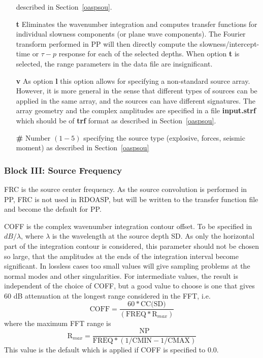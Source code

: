 \begin{itemize}
described in Section~\ref{oaspsou}.  
    \item[{\bf t}] Eliminates the wavenumber integration and computes
       transfer functions for individual slowness components (or plane wave
       components). The Fourier transform performed in PP will then
directly compute the slowness/intercept-time or $\tau - p$ response
for each of the selected depths. When option {\bf t} is selected, the
range parameters in the data file are insignificant.     
    \item[{\bf v}] As option {\bf l} this option allows for specifying
a non-standard source array. However, it is more general in the sense
that different types of sources can be applied in the same array, and
the sources can have different signatures. The array geometry and the
complex amplitudes are specified in a file {\bf input.strf} which
should be of {\bf trf} format as described in Section~\ref{oaspsou}. 
    \item[{\bf \#}] Number $(1-5)$ specifying the source type
       (explosive, forces, seismic moment) as described in Section~\ref{oaspsou}  
\end{itemize}


\subsubsection{Block III: Source Frequency}

FRC is the source center frequency. As the source convolution is
performed in PP,  FRC is not used in RDOASP, but will be written to the
transfer function file and become the default for PP.

COFF is the complex wavenumber
integration 
contour offset. To be specified in
		$dB/\lambda$, where $\lambda$ is the wavelength at the source 
		depth SD. As only the horizontal part of
		the integration contour is considered, this parameter
		should not be chosen so large, that the amplitudes
		at the ends of the integration interval become 
		significant. In lossless cases too small values
		will give sampling problems at the normal modes
		and other singularities. For intermediate values,
		the result is independent of the choice of COFF,
		but a good value to choose is one that gives 60 dB
		attenuation at the longest range considered in the FFT, i.e.
                \begin{displaymath}
		\mbox{COFF} = \frac{60 \ast \mbox{CC(SD)}}{( \mbox{FREQ} \ast \mbox{R}_{max} )}
		\end{displaymath} 
       		where the maximum FFT range is
       		\begin{displaymath}
		\mbox{R}_{max} = \frac{\mbox{NP}}{\mbox{FREQ}\ast(1/\mbox{CMIN} - 1/\mbox{CMAX})}
		\end{displaymath}
		This value is the default which is applied if COFF
		is specified to 0.0.

